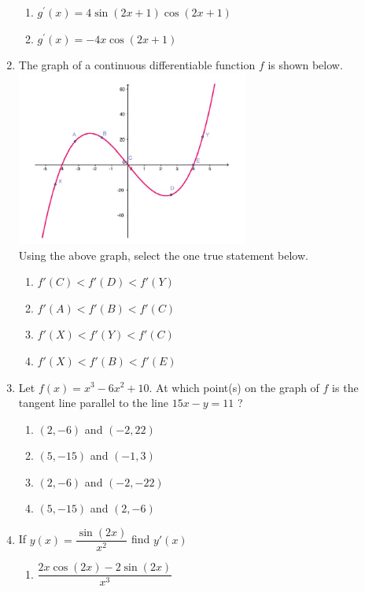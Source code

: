 \documentclass{article}
\begin{document}
\begin{enumerate}
\begin{minipage}[t]{\linewidth}
\begin{enumerate}
			\item  $g^{\prime}(x) = 4 \sin(2x + 1) \cos(2x + 1)$
			\item  $g^{\prime}(x) = -4x \cos(2x + 1)$
		\end{enumerate}
	\end{minipage}
	\item
	\begin{minipage}[t]{\linewidth}
		The graph of a continuous differentiable function \(f\) is shown
below.\\
\includegraphics[width=0.6\textwidth,height=\textheight]{graph1.PNG}\\
Using the above graph, select the one true statement below.\\[0.1em]
		\begin{enumerate}
		\itemsep1em
		\item  $f'(C) < f'(D) < f'(Y)$
			\item  $f'(A) < f'(B) < f'(C)$
			\item  $f'(X) < f'(Y) < f'(C)$
			\item  $f'(X) < f'(B) < f'(E)$
		\end{enumerate}
	\end{minipage}
	\item
	\begin{minipage}[t]{\linewidth}
		Let \(f(x)=x^{3}-6 x^{2}+10\). At which point(s) on the graph of \(f\)
is the tangent line parallel to the line \(15 x-y=11\) ?\\[0.1em]
		\begin{enumerate}
		\itemsep4em
			\item  $(2,-6)$ and $(-2,22)$
			\item  $(5,-15)$ and $(-1,3)$
			\item  $(2,-6)$ and $(-2,-22)$
			\item  $(5,-15)$ and $(2,-6)$
		\end{enumerate}
	\end{minipage}
	\item
	\begin{minipage}[t]{\linewidth}
		If \(y(x) = \dfrac{\sin(2x)}{x^2}\) find \(y'(x)\)\\[0.1em]
		\begin{enumerate}
		\itemsep1em
		\item  $\dfrac{2 x \cos(2 x) - 2 \sin(2 x)}{x^3}$


\end{enumerate}
\end{minipage}
\end{enumerate}
\end{document}
